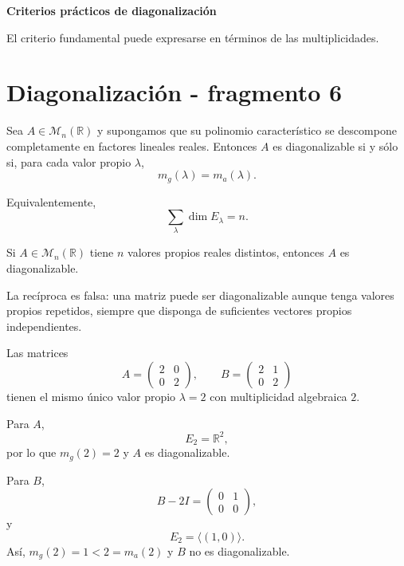 \textbf{Criterios prácticos de diagonalización}

El criterio fundamental puede expresarse en términos de las multiplicidades.


\section{Diagonalización - fragmento 6}
\begin{theorem}
Sea $A\in\mathcal M_n(\mathbb{R})$ y supongamos que su polinomio característico se descompone completamente en factores lineales reales. Entonces $A$ es diagonalizable si y sólo si, para cada valor propio $\lambda$,
\[
m_g(\lambda)=m_a(\lambda).
\]
\end{theorem}

Equivalentemente,
\[
\sum_{\lambda}\dim E_\lambda=n.
\]

\begin{corollary}
Si $A\in\mathcal M_n(\mathbb{R})$ tiene $n$ valores propios reales distintos, entonces $A$ es diagonalizable.
\end{corollary}

La recíproca es falsa: una matriz puede ser diagonalizable aunque tenga valores propios repetidos, siempre que disponga de suficientes vectores propios independientes.

\begin{example}
Las matrices
\[
A=\begin{pmatrix}
2&0\\
0&2
\end{pmatrix},
\qquad
B=\begin{pmatrix}
2&1\\
0&2
\end{pmatrix}
\]
tienen el mismo único valor propio $\lambda=2$ con multiplicidad algebraica $2$.

Para $A$,
\[
E_2=\mathbb{R}^2,
\]
por lo que $m_g(2)=2$ y $A$ es diagonalizable.

Para $B$,
\[
B-2I=\begin{pmatrix}0&1\\0&0\end{pmatrix},
\]
y
\[
E_2=\langle(1,0)\rangle.
\]
Así, $m_g(2)=1<2=m_a(2)$ y $B$ no es diagonalizable.
\end{example}

